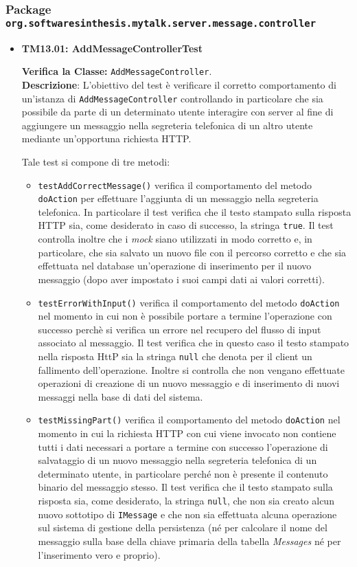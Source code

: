 \subsubsection{Package \texttt{org.softwaresinthesis.mytalk.server.message.controller}}
\begin{itemize}

\item \textbf{TM13.01: AddMessageControllerTest} 

\textbf{Verifica la Classe:} \texttt{AddMessageController}.\\
\textbf{Descrizione}: L'obiettivo del test è verificare il corretto comportamento di un'istanza di \texttt{AddMessageController} controllando in particolare che sia possibile da parte di un determinato utente interagire con server al fine di aggiungere un messaggio nella segreteria telefonica di un altro utente mediante un'opportuna richiesta HTTP\@.

Tale test si compone di tre metodi:
\begin{itemize}
\item \texttt{testAddCorrectMessage()} verifica il comportamento del metodo \texttt{doAction} per effettuare l'aggiunta di un messaggio nella segreteria telefonica. In particolare il test verifica che il testo stampato sulla risposta HTTP sia, come desiderato in caso di successo, la stringa \texttt{true}. Il test controlla inoltre che i \textit{mock} siano utilizzati in modo corretto e, in particolare, che sia salvato un nuovo file con il percorso corretto e che sia effettuata nel database un'operazione di inserimento per il nuovo messaggio (dopo aver impostato i suoi campi dati ai valori corretti).

\item \texttt{testErrorWithInput()} verifica il comportamento del metodo \texttt{doAction} nel momento in cui non è possibile portare a termine l'operazione con successo perchè si verifica un errore nel recupero del flusso di input associato al messaggio. Il test verifica che in questo caso il testo stampato nella risposta HttP sia la stringa \texttt{null} che denota per il client un fallimento dell'operazione. Inoltre si controlla che non vengano effettuate operazioni di creazione di un nuovo messaggio e di inserimento di nuovi messaggi nella base di dati del sistema.

\item \texttt{testMissingPart()} verifica il comportamento del metodo \texttt{doAction} nel momento in cui la richiesta HTTP con cui viene invocato non contiene tutti i dati necessari a portare a termine con successo l'operazione di salvataggio di un nuovo messaggio nella segreteria telefonica di un determinato utente, in particolare perché non è presente il contenuto binario del messaggio stesso. Il test verifica che il testo stampato sulla risposta sia, come desiderato, la stringa \texttt{null}, che non sia creato alcun nuovo  sottotipo di \texttt{IMessage} e che non sia effettuata alcuna operazione sul sistema di gestione della persistenza (né per calcolare il nome del messaggio sulla base della chiave primaria della tabella \textsl{Messages} né per l'inserimento vero e proprio).


\end{itemize}
\end{itemize}
